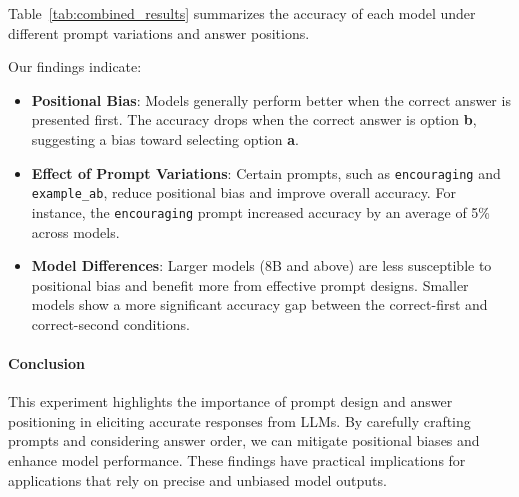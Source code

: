 Table~\ref{tab:combined_results} summarizes the accuracy of each model under different prompt variations and answer positions.

Our findings indicate:

\begin{itemize}
    \item \textbf{Positional Bias}: Models generally perform better when the correct answer is presented first. The accuracy drops when the correct answer is option \textbf{b}, suggesting a bias toward selecting option \textbf{a}.
    \item \textbf{Effect of Prompt Variations}: Certain prompts, such as \texttt{encouraging} and \texttt{example\_ab}, reduce positional bias and improve overall accuracy. For instance, the \texttt{encouraging} prompt increased accuracy by an average of 5\% across models.
    \item \textbf{Model Differences}: Larger models (8B and above) are less susceptible to positional bias and benefit more from effective prompt designs. Smaller models show a more significant accuracy gap between the correct-first and correct-second conditions.
\end{itemize}

\paragraph{Conclusion}

This experiment highlights the importance of prompt design and answer positioning in eliciting accurate responses from LLMs. By carefully crafting prompts and considering answer order, we can mitigate positional biases and enhance model performance. These findings have practical implications for applications that rely on precise and unbiased model outputs.

